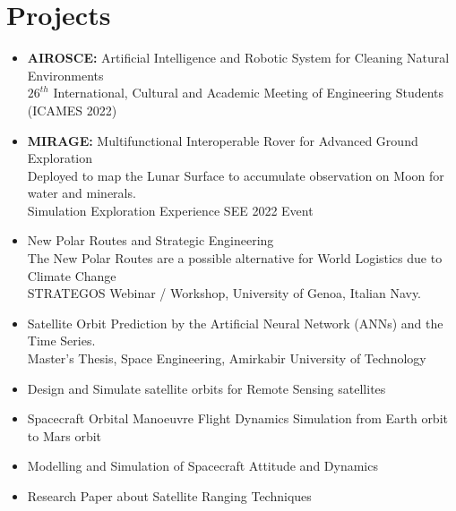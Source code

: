 \documentclass[10pt]{article} %
\begin{document}
\section{Projects}


\begin{itemize}
    \item \> \textbf{AIROSCE:} Artificial Intelligence and Robotic System for Cleaning Natural Environments\\[3pt] $26^{th}$ International, Cultural and Academic Meeting of Engineering Students (ICAMES 2022)
    \item \textbf{MIRAGE:} Multifunctional Interoperable Rover for Advanced Ground Exploration \\ \> Deployed to map the Lunar Surface to accumulate observation on Moon for water and minerals.\\ \> Simulation Exploration Experience SEE 2022 Event
    \item New Polar Routes and Strategic Engineering\\
    The New Polar Routes are a possible alternative for World Logistics due to Climate Change\\ STRATEGOS Webinar / Workshop, University of Genoa, Italian Navy.
    \item Satellite Orbit Prediction by the Artificial Neural Network (ANNs) and the Time Series. \\ \> Master's Thesis, Space Engineering, Amirkabir University of Technology
    \item Design and Simulate satellite orbits for Remote Sensing satellites
    \item Spacecraft Orbital Manoeuvre Flight Dynamics Simulation from Earth orbit to Mars orbit
    \item Modelling and Simulation of Spacecraft Attitude and Dynamics
    \item  Research Paper about Satellite Ranging Techniques
\end{itemize}


\end{document}
